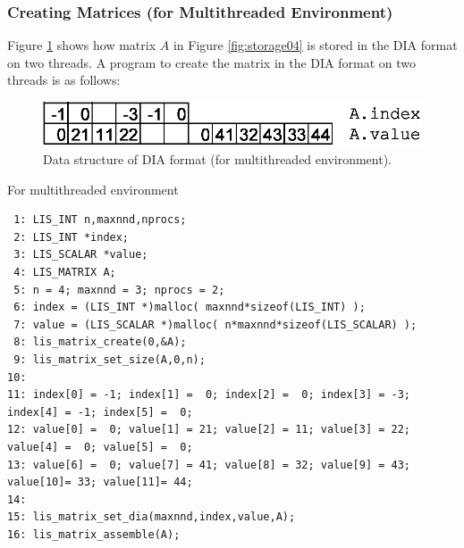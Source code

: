 \documentclass[a4paper]{article}
\begin{document}
\newpage
\subsubsection{Creating Matrices (for Multithreaded Environment)}
Figure \ref{fig:storage04_omp} shows how matrix $A$ in Figure \ref{fig:storage04} is stored in the DIA format on two threads. A program to create the matrix in the DIA format on two threads is as follows:
\begin{figure}[h]
{\centering 
\includegraphics{storage04_omp.eps} 
\caption{Data structure of DIA format (for multithreaded environment).}\label{fig:storage04_omp}}
\end{figure}
\begin{itemsquarebox}[l]{For multithreaded environment}
\small
\begin{verbatim}
 1: LIS_INT n,maxnnd,nprocs;
 2: LIS_INT *index;
 3: LIS_SCALAR *value;
 4: LIS_MATRIX A;
 5: n = 4; maxnnd = 3; nprocs = 2;
 6: index = (LIS_INT *)malloc( maxnnd*sizeof(LIS_INT) );
 7: value = (LIS_SCALAR *)malloc( n*maxnnd*sizeof(LIS_SCALAR) );
 8: lis_matrix_create(0,&A);
 9: lis_matrix_set_size(A,0,n);
10:
11: index[0] = -1; index[1] =  0; index[2] =  0; index[3] = -3; index[4] = -1; index[5] =  0;
12: value[0] =  0; value[1] = 21; value[2] = 11; value[3] = 22; value[4] =  0; value[5] =  0;
13: value[6] =  0; value[7] = 41; value[8] = 32; value[9] = 43; value[10]= 33; value[11]= 44;
14:
15: lis_matrix_set_dia(maxnnd,index,value,A);
16: lis_matrix_assemble(A);
\end{verbatim}
\end{itemsquarebox}

\newpage
\end{document}

